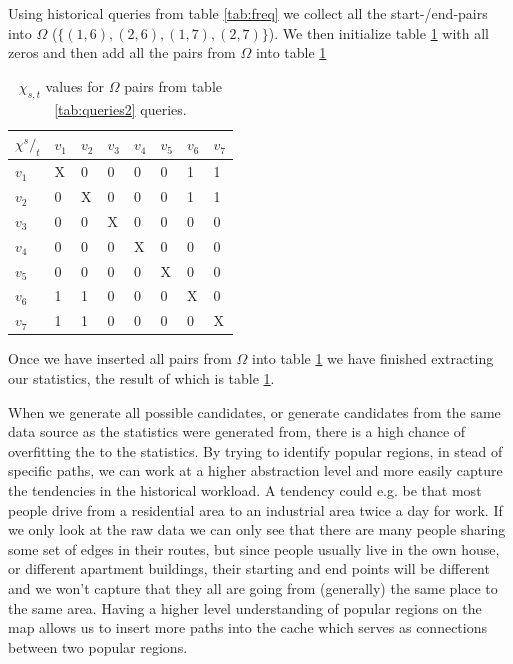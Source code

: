 Using historical queries from table \ref{tab:freq} we collect all the start-/end-pairs into $\Omega$ ($\{(1,6),(2,6),(1,7),(2,7)\}$). We then initialize table \ref{tab:chiex} with all zeros and then add all the pairs from $\Omega$ into table \ref{tab:chiex}

\begin{table}
\center
\begin{tabular}{|l||l|l|l|l|l|l|l|}
\textbf{$\chi {^s/_t}$}	& $v_1$	& $v_2$	& $v_3$	& $v_4$	& $v_5$	& $v_6$	& $v_7$ \\\hline
$v_1$			& X	& 0	& 0	& 0	& 0	& 1	& 1	 \\
$v_2$			& 0	& X	& 0	& 0	& 0	& 1	& 1	 \\
$v_3$			& 0	& 0	& X	& 0	& 0	& 0	& 0	 \\
$v_4$			& 0	& 0	& 0	& X	& 0	& 0	& 0	 \\
$v_5$			& 0	& 0	& 0	& 0	& X	& 0	& 0	 \\
$v_6$			& 1	& 1	& 0	& 0	& 0	& X	& 0	 \\
$v_7$			& 1	& 1	& 0	& 0	& 0	& 0	& X	 \\\hline
\end{tabular}
\caption{$\chi_{s,t}$ values for $\Omega$ pairs from table \ref{tab:queries2} queries.}
\label{tab:chiex}
\end{table}


Once we have inserted all pairs from $\Omega$ into table \ref{tab:chiex} we have finished extracting our statistics, the result of which is table \ref{tab:chiex}.




When we generate all possible \spath candidates, or generate \spath candidates from the same data source as the statistics were generated from, there is a high chance of overfitting the \spaths to the statistics. By trying to identify popular regions, in stead of specific paths, we can work at a higher abstraction level and more easily capture the tendencies in the historical workload. A tendency could e.g. be that most people drive from a residential area to an industrial area twice a day for work. If we only look at the raw data we can only see that there are many people sharing some set of edges in their routes, but since people usually live in the own house, or different apartment buildings, their starting and end points will be different and we won't capture that they all are going from (generally) the same place to the same area. Having a higher level understanding of popular regions on the map allows us to insert more paths into the cache which serves as connections between two popular regions.


